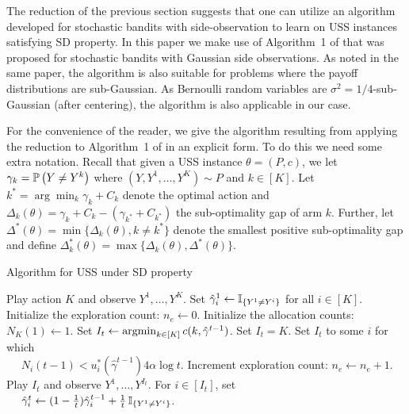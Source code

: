 \newcommand{\set}{\leftarrow}
\newcommand{\hgamma}{\hat{\gamma}}
The reduction of the previous section suggests that one can  utilize 
an algorithm developed for stochastic bandits with side-observation to learn on USS instances satisfying SD property.
In this paper we make use of Algorithm~1 of \cite{WGySz:NIPS15}
that was proposed for stochastic bandits with Gaussian side observations. 
As noted in the same paper, the algorithm is also suitable for problems where the payoff distributions are sub-Gaussian.
As Bernoulli random variables are $\sigma^2=1/4$-sub-Gaussian (after centering),
the algorithm is also applicable in our case.

For the convenience of the reader, we give the algorithm resulting from applying the reduction to Algorithm~1 
of \cite{WGySz:NIPS15} in an explicit form.
To do this we need some extra notation.
Recall that given a USS instance $\theta = (P,c)$, we let $\gamma_k = \mathbb{P}\left(Y\ne Y^k\right)$ where $(Y,Y^1,\dots,Y^K)\sim P$ and $k\in [K]$. Let $k^*=\arg\min_k \gamma_k +C_k$ denote the optimal action and $\Delta_k(\theta)=\gamma_k+C_k-(\gamma_{k^*}+C_{k^*})$ the sub-optimality gap of arm $k$. Further, let $\Delta^*(\theta) = \min\{\Delta_k(\theta), k\neq k^* \}$ denote the smallest positive sub-optimality gap and define $\Delta_k^*(\theta) =\max\{\Delta_k(\theta), \Delta^*(\theta)\}$.

		\begin{algorithm}[t]
			\caption{Algorithm for USS under SD property} 
			\label{alg:asym}
			\begin{algorithmic}[1]
				\STATE Play action $K$ and observe  $Y^1,\dots,Y^K$.
				\STATE Set $\hgamma_{i}^1 \set \one{Y^1\ne Y^i}$ for all $i\in [K]$.
				\STATE Initialize the exploration count: $n_e \set 0$.
				\STATE Initialize the allocation counts: $N_K(1) \set 1$.
				\IF{$\frac{N(t-1)}{4\alpha \log t}\in C(\hgamma^{t-1})$} \label{alg:check}
				\STATE Set $I_t \set \argmin_{k\in [K]} c(k,\hgamma^{t-1})$. \label{alg:greedy}
				\ELSE
				 \label{alg:starve}
				\STATE Set $I_t =K$. \label{alg:forced}
				\ELSE
				\STATE Set $I_t$ to some $i$ for which \label{alg:plan} \\
				$\quad$ $N_i(t-1)< u_i^*(\hgamma^{t-1})4\alpha\log t$.
				\ENDIF
				\STATE Increment exploration count: $n_e \set n_e+1$.
				\ENDIF
				\STATE Play $I_t$ and observe  $Y^1,\dots,Y^{I_t}$.
				\STATE For $i\in [I_t]$, set\\
				$\quad$ $\hgamma_i^t \set (1-{1\over t}) \hgamma_i^{t-1} + {1\over t} \,\one{Y^1\ne Y^i}$.
				\ENDFOR
			\end{algorithmic}
		\end{algorithm}

